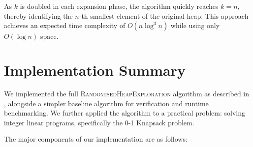 \documentclass[conference]{IEEEtran}
\begin{document}
As $k$ is doubled in each expansion phase, the algorithm quickly reaches $k = n$, thereby identifying the $n$-th smallest element of the original heap. This approach achieves an expected time complexity of $O(n \log^3 n)$ while using only $O(\log n)$ space.


\section{Implementation Summary}

We implemented the full \textsc{RandomisedHeapExploration} algorithm as described in \cite{Borst2025}, alongside a simpler baseline algorithm for verification and runtime benchmarking. We further applied the algorithm to a practical problem: solving integer linear programs, specifically the 0-1 Knapsack problem. 

The major components of our implementation are as follows:
\end{document}
